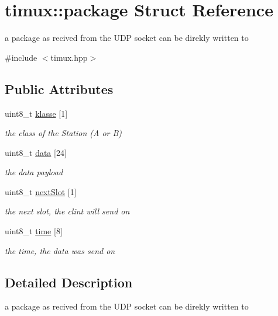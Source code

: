 \hypertarget{structtimux_1_1package}{\section{timux\+:\+:package Struct Reference}
\label{structtimux_1_1package}
}


a package as recived from the U\+D\+P socket can be direkly written to  




{\ttfamily \#include $<$timux.\+hpp$>$}

\subsection*{Public Attributes}
\begin{DoxyCompactItemize}
\item 
uint8\+\_\+t \hyperlink{structtimux_1_1package_a95fc0bef41718ca6be503b1a65ede4ed}{klasse} \mbox{[}1\mbox{]}
\begin{DoxyCompactList}\small\item\em the class of the Station (A or B) \end{DoxyCompactList}\item 
uint8\+\_\+t \hyperlink{structtimux_1_1package_a87c845817d21a505e3fe10d7c0488a25}{data} \mbox{[}24\mbox{]}
\begin{DoxyCompactList}\small\item\em the data payload \end{DoxyCompactList}\item 
uint8\+\_\+t \hyperlink{structtimux_1_1package_acc01431f30b66014c1c61975d84e519d}{next\+Slot} \mbox{[}1\mbox{]}
\begin{DoxyCompactList}\small\item\em the next slot, the clint will send on \end{DoxyCompactList}\item 
uint8\+\_\+t \hyperlink{structtimux_1_1package_a201dd7d030a9950d5e36481668597c24}{time} \mbox{[}8\mbox{]}
\begin{DoxyCompactList}\small\item\em the time, the data was send on \end{DoxyCompactList}\end{DoxyCompactItemize}


\subsection{Detailed Description}
a package as recived from the U\+D\+P socket can be direkly written to 

